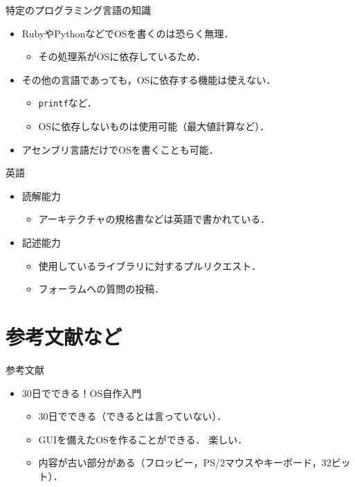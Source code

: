 \documentclass[titlepage,dvipdfmx,uplatex,a4j,12pt]{beamer}
\begin{document}
\begin{frame}{特定のプログラミング言語の知識}
    \begin{itemize}
        \item RubyやPythonなどでOSを書くのは恐らく無理．
            \begin{itemize}
                \item その処理系がOSに依存しているため．
            \end{itemize}
        \item その他の言語であっても，OSに依存する機能は使えない．
            \begin{itemize}
                \item \lstinline{printf}など．
                \item OSに依存しないものは使用可能（最大値計算など）．
            \end{itemize}
        \item アセンブリ言語だけでOSを書くことも可能．
    \end{itemize}
\end{frame}

\begin{frame}{英語}
    \begin{itemize}
        \item 読解能力
            \begin{itemize}
                \item アーキテクチャの規格書などは英語で書かれている．
            \end{itemize}
        \item 記述能力
            \begin{itemize}
                \item 使用しているライブラリに対するプルリクエスト．
                \item フォーラムへの質問の投稿．
            \end{itemize}
    \end{itemize}
\end{frame}

\section{参考文献など}

\begin{frame}{参考文献}
    \begin{itemize}
        \item 30日でできる！OS自作入門
            \begin{itemize}
                \item 30日でできる（できるとは言っていない）．
                \item GUIを備えたOSを作ることができる． 楽しい．
                \item 内容が古い部分がある（フロッピー，PS/2マウスやキーボード，32ビット）．
            \end{itemize}
    \end{itemize}
\end{frame}
\end{document}

